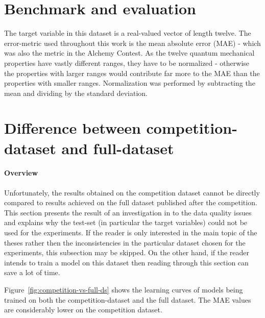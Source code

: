 \section{Benchmark and evaluation}

The target variable in this dataset is a real-valued vector of length twelve. The error-metric used throughout this work is the mean absolute error (MAE) - which was also the metric in the Alchemy Contest. As the twelve quantum mechanical properties have vastly different ranges, they have to be normalized - otherwise the properties with larger ranges would contribute far more to the MAE than the properties with smaller ranges. Normalization was performed by subtracting the mean and dividing by the standard deviation.

\section{Difference between competition-dataset and full-dataset}
\label{sec:diff-old-new-ds}


\paragraph{Overview} Unfortunately, the results obtained on the competition dataset cannot be directly compared to results achieved on the full dataset published after the competition. This section presents the result of an investigation in to the data quality issues and explains why the test-set (in particular the target variables) could not be used for the experiments. If the reader is only interested in the main topic of the theses rather then the inconsistencies in the particular dataset chosen for the experiments, this subsection may be skipped. On the other hand, if the reader intends to train a model on this dataset then reading through this section can save a lot of time.

Figure~\ref{fig:competition-vs-full-ds} shows the learning curves of models being trained on both the competition-dataset and the full dataset. The MAE values are considerably lower on the competition dataset.


